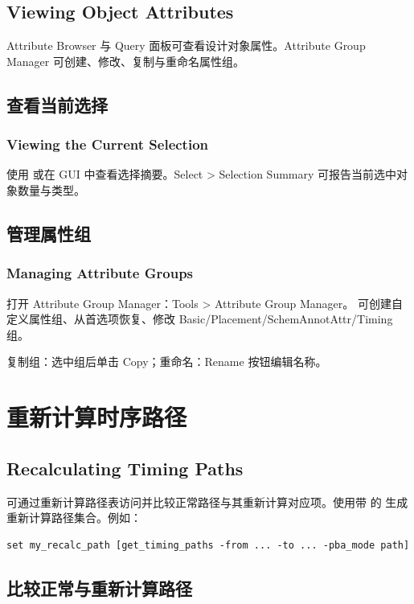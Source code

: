 \subsection*{Viewing Object Attributes}

Attribute Browser 与 Query 面板可查看设计对象属性。Attribute Group Manager 可创建、修改、复制与重命名属性组。

\subsection{查看当前选择}
\subsubsection*{Viewing the Current Selection}

使用  或在 GUI 中查看选择摘要。Select > Selection Summary 可报告当前选中对象数量与类型。

\subsection{管理属性组}
\subsubsection*{Managing Attribute Groups}

打开 Attribute Group Manager：Tools > Attribute Group Manager。
可创建自定义属性组、从首选项恢复、修改 Basic/Placement/SchemAnnotAttr/Timing 组。

复制组：选中组后单击 Copy；重命名：Rename 按钮编辑名称。

\section{重新计算时序路径}
\subsection*{Recalculating Timing Paths}

可通过重新计算路径表访问并比较正常路径与其重新计算对应项。使用带  的  生成重新计算路径集合。例如：
\begin{lstlisting}
set my_recalc_path [get_timing_paths -from ... -to ... -pba_mode path]
\end{lstlisting}

\subsection{比较正常与重新计算路径}
